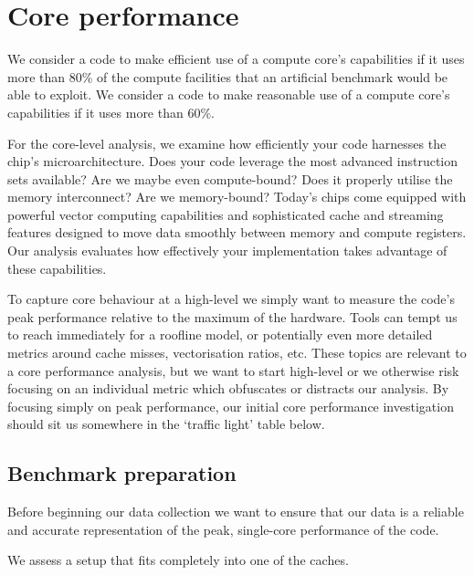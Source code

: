\section{Core performance}
\label{section:high-level:core}

\begin{summary}
 We consider a code to make efficient use of a compute core's capabilities if it uses more than 80\% of the compute facilities that an artificial benchmark would be able to exploit.
 We consider a code to make reasonable use of a compute core's capabilities if it uses more than 60\%.
\end{summary}

For the core-level analysis, we examine how efficiently your code harnesses the chip's microarchitecture. 
Does your code leverage the most advanced instruction sets available?
Are we maybe even compute-bound? 
Does it properly utilise the memory interconnect? 
Are we memory-bound?
Today's chips come equipped with powerful vector computing capabilities and sophisticated cache and streaming features designed to move data smoothly between memory and compute registers. 
Our analysis evaluates how effectively your implementation takes advantage of these capabilities.

To capture core behaviour at a high-level we simply want to measure the code's peak performance relative to the maximum of the hardware. Tools can tempt us to reach immediately for a roofline model, or potentially even more detailed metrics around cache misses, vectorisation ratios, etc. These topics are relevant to a core performance analysis, but we want to start high-level or we otherwise risk focusing on an individual metric which obfuscates or distracts our analysis. By focusing simply on peak performance, our initial core performance investigation should sit us somewhere in the `traffic light' table below.

\subsection{Benchmark preparation}


Before beginning our data collection we want to ensure that our data is a reliable and accurate representation of the peak, single-core performance of the code.

\begin{assessmentcrime}\label{assessmentcrime-cache-fit}
 We assess a setup that fits completely into one of the caches.
\end{assessmentcrime}

